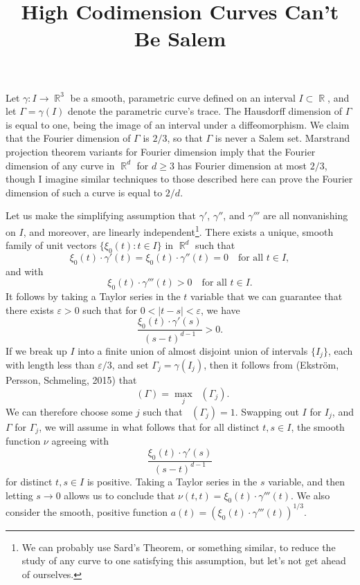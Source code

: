 \documentclass[dvipsnames,letterpaper,12pt]{article}
\title{High Codimension Curves Can't Be Salem}
\DeclareMathOperator{\fordim}{\dim_{\mathbb{F}}}
\DeclareMathOperator{\RR}{\mathbb{R}}
\begin{document}
\maketitle

Let $\gamma: I \to \RR^3$ be a smooth, parametric curve defined on an interval $I \subset \RR$, and let $\Gamma = \gamma(I)$ denote the parametric curve's trace. The Hausdorff dimension of $\Gamma$ is equal to one, being the image of an interval under a diffeomorphism. We claim that the Fourier dimension of $\Gamma$ is $2/3$, so that $\Gamma$ is never a Salem set. Marstrand projection theorem variants for Fourier dimension imply that the Fourier dimension of any curve in $\RR^d$ for $d \geq 3$ has Fourier dimension at most $2/3$, though I imagine similar techniques to those described here can prove the Fourier dimension of such a curve is equal to $2/d$.

Let us make the simplifying assumption that $\gamma'$, $\gamma''$, and $\gamma'''$ are all nonvanishing on $I$, and moreover, are linearly independent\footnote{We can probably use Sard's Theorem, or something similar, to reduce the study of any curve to one satisfying this assumption, but let's not get ahead of ourselves.}. There exists a unique, smooth family of unit vectors $\{ \xi_0(t) : t \in I \}$ in $\RR^d$ such that
%
\[ \xi_0(t) \cdot \gamma'(t) = \xi_0(t) \cdot \gamma''(t) = 0 \quad\text{for all $t \in I$}, \]
%
and with
%
\[ \xi_0(t) \cdot \gamma'''(t) > 0 \quad \text{for all $t \in I$}. \]
%
It follows by taking a Taylor series in the $t$ variable that we can guarantee that there exists $\varepsilon > 0$ such that for $0 < |t - s| < \varepsilon$, we have
%
\[ \frac{\xi_0(t) \cdot \gamma'(s)}{(s - t)^{d-1}} > 0. \]
%
If we break up $I$ into a finite union of almost disjoint union of intervals $\{ I_j \}$, each with length less than $\varepsilon / 3$, and set $\Gamma_j = \gamma(I_j)$, then it follows from (Ekstr\"{o}m, Persson, Schmeling, 2015) that
%
\[ \fordim(\Gamma) = \max_j \fordim(\Gamma_j). \]
%
We can therefore choose some $j$ such that $\fordim(\Gamma_j) = 1$. Swapping out $I$ for $I_j$, and $\Gamma$ for $\Gamma_j$, we will assume in what follows that for all distinct $t,s \in I$, the smooth function $\nu$ agreeing with
%
\[ \frac{\xi_0(t) \cdot \gamma'(s)}{(s - t)^{d-1}} \]
%
for distinct $t,s \in I$ is positive. Taking a Taylor series in the $s$ variable, and then letting $s \to 0$ allows us to conclude that $\nu(t,t) = \xi_0(t) \cdot \gamma'''(t)$. We also consider the smooth, positive function $a(t) = (\xi_0(t) \cdot \gamma'''(t))^{1/3}$.
\end{document}

